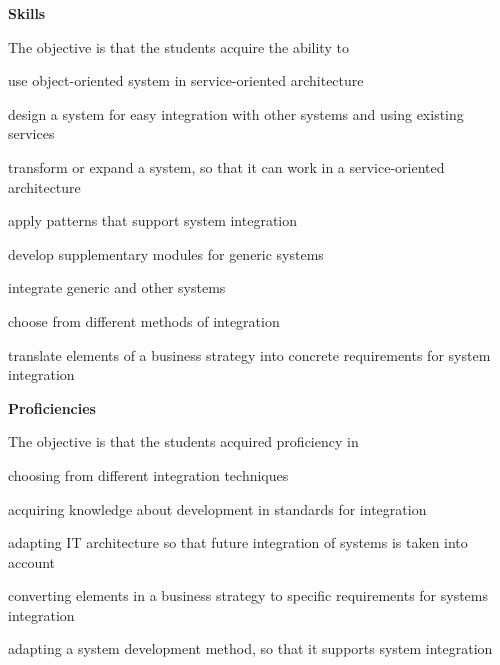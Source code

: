 \documentclass[Screen16to9,17pt]{foils}
\begin{document}

{\bf Skills}

The objective is that the students acquire the ability to

\begin{list2}
\item use object-oriented system in service-oriented architecture
\item design a system for easy integration with other systems and using existing services
\item transform or expand a system, so that it can work in a service-oriented architecture
\item apply patterns that support system integration
\item develop supplementary modules for generic systems
\item integrate generic and other systems
\item choose from different methods of integration
\item translate elements of a business strategy into concrete requirements for system integration
\end{list2}


{\bf Proficiencies}

The objective is that the students acquired proficiency in

\begin{list2}
\item choosing from different integration techniques
\item acquiring knowledge about development in standards for integration
\item adapting IT architecture so that future integration of systems is taken into account
\item converting elements in a business strategy to specific requirements for systems integration
\item adapting a system development method, so that it supports system integration
\end{list2}






\end{document}

